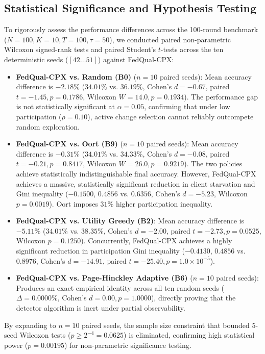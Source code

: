 \documentclass[conference]{IEEEtran}
\begin{document}
\subsection{Statistical Significance and Hypothesis Testing}
To rigorously assess the performance differences across the 100-round benchmark ($N=100, K=10, T=100, \tau=50$), we conducted paired non-parametric Wilcoxon signed-rank tests and paired Student's $t$-tests across the ten deterministic seeds ($[42 \dots 51]$) against FedQual-CPX:
\begin{itemize}
\item \textbf{FedQual-CPX vs. Random (B0)} ($n=10$ paired seeds): Mean accuracy difference is $-2.18\%$ ($34.01\%$ vs. $36.19\%$, Cohen's $d = -0.67$, paired $t = -1.45, p = 0.1786$, Wilcoxon $W = 14.0, p = 0.1934$). The performance gap is not statistically significant at $\alpha = 0.05$, confirming that under low participation ($\rho = 0.10$), active change selection cannot reliably outcompete random exploration.
\item \textbf{FedQual-CPX vs. Oort (B9)} ($n=10$ paired seeds): Mean accuracy difference is $-0.31\%$ ($34.01\%$ vs. $34.33\%$, Cohen's $d = -0.08$, paired $t = -0.21, p = 0.8417$, Wilcoxon $W = 26.0, p = 0.9219$). The two policies achieve statistically indistinguishable final accuracy. However, FedQual-CPX achieves a massive, statistically significant reduction in client starvation and Gini inequality ($-0.1500$, $0.4856$ vs. $0.6356$, Cohen's $d = -5.23$, Wilcoxon $p = 0.0019$). Oort imposes $31\%$ higher participation inequality.
\item \textbf{FedQual-CPX vs. Utility Greedy (B2)}: Mean accuracy difference is $-5.11\%$ ($34.01\%$ vs. $38.35\%$, Cohen's $d = -2.00$, paired $t = -2.73, p = 0.0525$, Wilcoxon $p = 0.1250$). Concurrently, FedQual-CPX achieves a highly significant reduction in participation Gini inequality ($-0.4130$, $0.4856$ vs. $0.8976$, Cohen's $d = -14.91$, paired $t = -25.40, p = 1.0 \times 10^{-5}$).
\item \textbf{FedQual-CPX vs. Page-Hinckley Adaptive (B6)} ($n=10$ paired seeds): Produces an exact empirical identity across all ten random seeds ($\Delta = 0.0000\%$, Cohen's $d = 0.00, p = 1.0000$), directly proving that the detector algorithm is inert under partial observability.
\end{itemize}
By expanding to $n=10$ paired seeds, the sample size constraint that bounded $5$-seed Wilcoxon tests ($p \ge 2^{-4} = 0.0625$) is eliminated, confirming high statistical power ($p = 0.00195$) for non-parametric significance testing.
\end{document}
